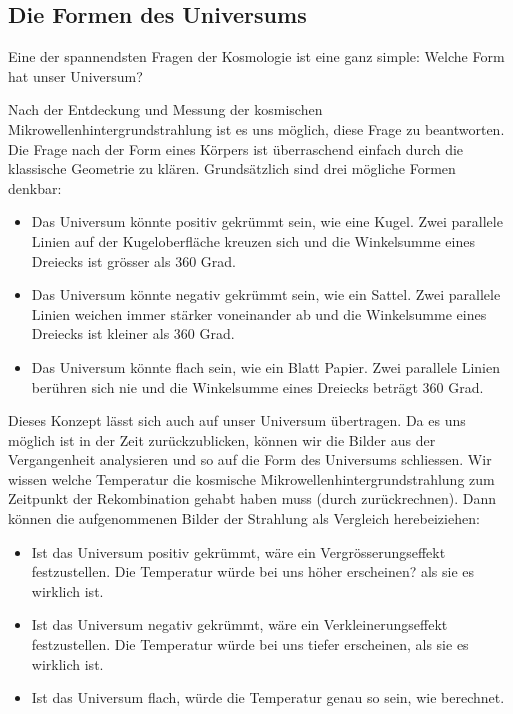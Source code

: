 	
	\subsection{Die Formen des Universums}
	Eine der spannendsten Fragen der Kosmologie ist eine ganz simple: Welche Form hat unser Universum?
	
	Nach der Entdeckung und Messung der kosmischen Mikrowellenhintergrundstrahlung ist es uns möglich, diese Frage zu beantworten.
	Die Frage nach der Form eines Körpers ist überraschend einfach durch die klassische Geometrie zu klären.
	Grundsätzlich sind drei mögliche Formen denkbar:
	\begin{itemize}
		\item Das Universum könnte positiv gekrümmt sein, wie eine Kugel.
		Zwei parallele Linien auf der Kugeloberfläche kreuzen sich und die Winkelsumme eines Dreiecks ist grösser als 360 Grad.
		\item Das Universum könnte negativ gekrümmt sein, wie ein Sattel.
		Zwei parallele Linien weichen immer stärker voneinander ab und die Winkelsumme eines Dreiecks ist kleiner als 360 Grad.
		\item Das Universum könnte flach sein, wie ein Blatt Papier.
		Zwei parallele Linien berühren sich nie und die Winkelsumme eines Dreiecks beträgt 360 Grad.
	\end{itemize}
	Dieses Konzept lässt sich auch auf unser Universum übertragen.
	Da es uns möglich ist in der Zeit zurückzublicken, können wir die Bilder aus der Vergangenheit analysieren und so auf die Form des Universums schliessen.
	Wir wissen welche Temperatur die kosmische Mikrowellenhintergrundstrahlung zum Zeitpunkt der Rekombination gehabt haben muss (durch zurückrechnen).
	Dann können die aufgenommenen Bilder der Strahlung als Vergleich herebeiziehen:
	\begin{itemize}
		\item Ist das Universum positiv gekrümmt, wäre ein Vergrösserungseffekt festzustellen.
		Die Temperatur würde bei uns höher erscheinen? als sie es wirklich ist.
		\item Ist das Universum negativ gekrümmt, wäre ein Verkleinerungseffekt festzustellen.
		Die Temperatur würde bei uns tiefer erscheinen, als sie es wirklich ist.
		\item Ist das Universum flach, würde die Temperatur genau so sein, wie berechnet.
	\end{itemize} 
	
	
	
